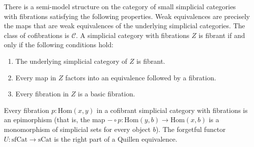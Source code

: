 \documentclass[reqno]{amsart}
\theoremstyle{definition}
\theoremstyle{remark}
\newcommand{\fs}[1]{\mathrm{#1}}
\newcommand{\Hom}{\fs{Hom}}
\newcommand{\sCat}{\fs{sCat}}
\newcommand{\sfCat}{\fs{sfCat}}
\numberwithin{figure}{section}
\begin{document}
\begin{prop}
There is a semi-model structure on the category of small simplicial categories with fibrations satisfying the following properties.
Weak equivalences are precisely the maps that are weak equivalences of the underlying simplicial categories.
The class of cofibrations is $\mathcal{C}$.
A simplicial category with fibrations $Z$ is fibrant if and only if the following conditions hold:
\begin{enumerate}
\item \label{it:fib-a} The underlying simplicial category of $Z$ is fibrant.
\item \label{it:fib-b} Every map in $Z$ factors into an equivalence followed by a fibration.
\item \label{it:fib-c} Every fibration in $Z$ is a basic fibration.
\end{enumerate}
Every fibration $p : \Hom(x,y)$ in a cofibrant simplicial category with fibrations is an epimorphism (that is, the map $- \circ p : \Hom(y,b) \to \Hom(x,b)$ is a monomorphism of simplicial sets for every object $b$).
The forgetful functor $U : \sfCat \to \sCat$ is the right part of a Quillen equivalence.
\end{prop}
\end{document}
